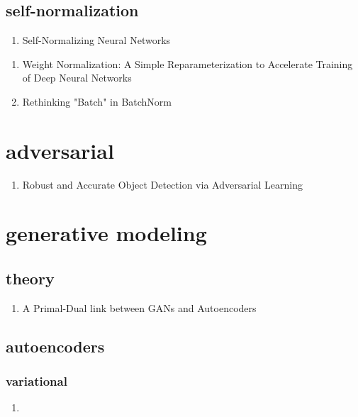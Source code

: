 \documentclass[acmlarge]{acmart}
\begin{document}
	\subsection{self-normalization}
	\begin{enumerate}
		\item Self-Normalizing Neural Networks \cite{Klambauer2017SelfNormalizingNN} 

	\end{enumerate}
\begin{enumerate}
	\item Weight Normalization: A Simple Reparameterization to Accelerate Training of Deep Neural Networks \cite{Salimans2016WeightNA} 

	\item Rethinking "Batch" in BatchNorm \cite{Wu2021RethinkingI} 

\end{enumerate}
\section{adversarial}
\begin{enumerate}
	\item Robust and Accurate Object Detection via Adversarial Learning \cite{Chen2021RobustAA} 

\end{enumerate}
\section{generative modeling}
	\subsection{theory}
	\begin{enumerate}
		\item A Primal-Dual link between GANs and Autoencoders \cite{Husain2019APL} 

	\end{enumerate}
	\subsection{autoencoders}
		\subsubsection{variational}
		\begin{enumerate}
			\item
		\end{enumerate}
\end{document}
